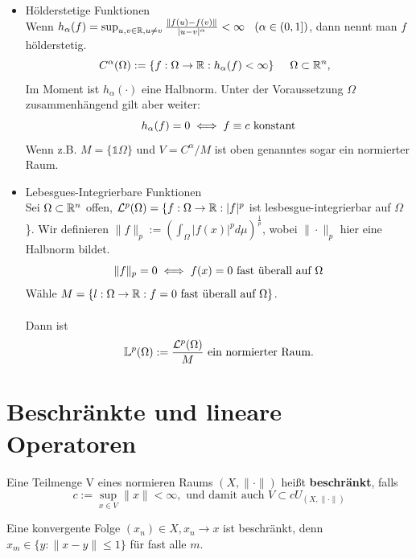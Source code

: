 \begin{beispiel}
\begin{itemize}
	\item Hölderstetige Funktionen  \\
	Wenn $h_{\alpha}(f) = \sup_{u,v \in \mathbb{R}, u \neq v} \frac{\| f(u) - f(v)\|}{|u - v|^{\alpha}} < \infty \hspace{0.25cm} \left( \alpha \in (0, 1] \right)$, dann nennt man $f$ hölderstetig.
	\[ C^{\alpha}(\Omega) := \{ f: \Omega \rightarrow \mathbb{R}: h_{\alpha}(f) < \infty \} \hspace{0.5cm} \Omega \subset \mathbb{R}^{n}, \hspace{0.25cm} \]
	Im Moment ist $h_{\alpha}( \cdot )$ eine Halbnorm. Unter der Voraussetzung $\Omega$ zusammenhängend gilt aber weiter:
	\[ h_{\alpha}(f) = 0 \iff f \equiv c \text{ konstant} \]
	Wenn z.B. $M = \{ \mathds{1} \Omega \}$ und $V = C^{\alpha}/M$ ist oben genanntes sogar ein normierter Raum.
	\item Lebesgues-Integrierbare Funktionen  \\
	Sei $\Omega \subset \mathbb{R}^{n}$ offen, $\mathcal{L}^{p}(\Omega) = \{ f: \Omega \rightarrow \mathbb{R} : |f|^{p}$ ist lesbesgue-integrierbar auf $\Omega$  \}.
	Wir definieren $\| f \|_{p} := \left( \int_{\Omega} |f(x)|^{p} d\mu \right)^{\frac{1}{p}}$, wobei $\| \cdot \|_{p}$ hier eine Halbnorm bildet.
	\[ \| f \|_{p} = 0 \iff  f(x) = 0 \text{ fast überall auf } \Omega \]
	Wähle $M = \{ l: \Omega \rightarrow \mathbb{R}: f = 0 \text{ fast überall auf } \Omega \}$. \\ \\
	Dann ist
	\[ \mathbb{L}^{p}(\Omega) := \frac{\mathcal{L}^{p}(\Omega)}{M} \text{ ein normierter Raum.} \]
\end{itemize}
\end{beispiel}


\newpage
\section{Beschr{\"a}nkte und lineare Operatoren}

\begin{definition} 
	Eine Teilmenge V eines normieren Raums $(X, \| \cdot \|)$ hei{\ss}t \textbf{beschränkt}, falls 
	\[ c := \sup_{x \in V} \| x \| < \infty, \text{ und damit auch } V \subset c U_{(X, \| \cdot \| )} \]
\end{definition}

\begin{bemerkung}
Eine konvergente Folge $(x_{n})	\in X, x_{n} \rightarrow x$ ist beschränkt, denn $x_{m} \in \{ y: \| x - y \| \leq 1 \}$ für fast alle $m$.
\end{bemerkung}

